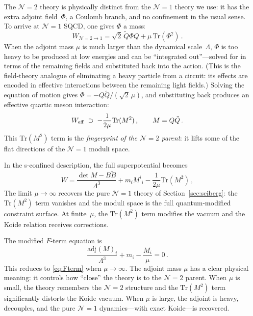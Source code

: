 \documentclass[12pt,a4paper]{article}
\newcommand{\Tr}{\mathrm{Tr}}
\newcommand{\adj}{\mathrm{adj}}
\begin{document}
The $\mathcal{N}=2$ theory is physically distinct from the
$\mathcal{N}=1$ theory we use:
it has the extra adjoint field~$\Phi$, a Coulomb branch, and no
confinement in the usual sense. To arrive at $\mathcal{N}=1$ SQCD,
one gives $\Phi$ a mass:
\begin{equation}
  W_{\mathcal{N}=2\to1} = \sqrt{2}\,\tilde Q \Phi Q
    + \mu\,\Tr(\Phi^2)\,.
  \label{eq:N2toN1}
\end{equation}
When the adjoint mass $\mu$ is much larger than the dynamical
scale~$\Lambda$, $\Phi$ is too heavy to be produced at low
energies and can be ``integrated out''---solved for in terms of
the remaining fields and substituted back into the action. (This is
the field-theory analogue of eliminating a heavy particle from
a circuit: its effects are encoded in effective interactions between
the remaining light fields.)
Solving the equation of motion gives
$\Phi = -Q\tilde Q/(\sqrt{2}\,\mu)$, and substituting back produces
an effective quartic meson interaction:
\begin{equation}
  W_{\rm eff} \;\supset\; -\frac{1}{2\mu}\Tr(M^2)\,,
  \qquad M = Q\tilde Q\,.
  \label{eq:quartic}
\end{equation}
This $\Tr(M^2)$ term is the \emph{fingerprint of the $\mathcal{N}=2$
parent}: it lifts some of the flat directions of the $\mathcal{N}=1$
moduli space.

In the s-confined description, the full superpotential becomes
\begin{equation}
  W = \frac{\det M - B\tilde B}{\Lambda^3}
    + m_i M^i{}_i
    - \frac{1}{2\mu}\Tr(M^2)\,,
  \label{eq:N2flow}
\end{equation}
The limit $\mu\to\infty$ recovers the pure $\mathcal{N}=1$ theory
of Section~\ref{sec:seiberg}: the $\Tr(M^2)$ term vanishes and the
moduli space is the full quantum-modified constraint surface.
At finite~$\mu$, the $\Tr(M^2)$ term modifies the vacuum and the
Koide relation receives corrections.

The modified $F$-term equation is
\begin{equation}
  \frac{\adj(M)_i}{\Lambda^3} + m_i - \frac{M_i}{\mu} = 0\,.
  \label{eq:Fterm_mu}
\end{equation}
This reduces to \eqref{eq:Fterm} when $\mu\to\infty$.
The adjoint mass $\mu$ has a clear physical meaning: it controls how
``close'' the theory is to the $\mathcal{N}=2$ parent. When $\mu$
is small, the theory remembers the $\mathcal{N}=2$ structure and the
$\Tr(M^2)$ term significantly distorts the Koide vacuum. When $\mu$
is large, the adjoint is heavy, decouples, and the pure
$\mathcal{N}=1$ dynamics---with exact Koide---is recovered.
\end{document}
